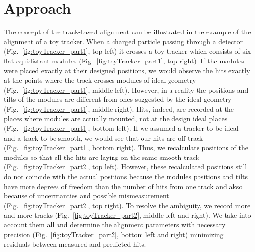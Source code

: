 \section{Approach}
\label{sec:alignmentAlg}


The concept of the track-based alignment can be illustrated in the example of the alignment of a toy tracker. When a charged particle passing through a detector (Fig.~\ref{fig:toyTracker_part1}, top left) it crosses a toy tracker which consists of six flat equidistant modules (Fig.~\ref{fig:toyTracker_part1}, top right). If the modules were placed exactly at their designed positions, we would observe the hits exactly at the points where the track crosses modules of ideal geometry (Fig.~\ref{fig:toyTracker_part1}, middle left). However, in a reality the positions and tilts of the modules are different from ones suggested by the ideal geometry (Fig.~\ref{fig:toyTracker_part1}, middle right). Hits, indeed, are recorded at the places where modules are actually mounted, not at the design ideal places (Fig.~\ref{fig:toyTracker_part1}, bottom left). If we assumed a tracker to be ideal and a track to be smooth, we would see that our hits are off-track (Fig.~\ref{fig:toyTracker_part1}, bottom right). Thus, we recalculate positions of the modules so that all the hits are laying on the same smooth track (Fig.~\ref{fig:toyTracker_part2}, top left). However, these recalculated positions still do not coincide with the actual positions because the modules positions and tilts have more degrees of freedom than the number of hits from one track and akso because of uncerntanties and possible mismeasurement (Fig.~\ref{fig:toyTracker_part2}, top right). To resolve the ambiguity, we record more and more tracks (Fig.~\ref{fig:toyTracker_part2}, middle left and right). We take into account them all and determine the alignment parameters with necessary precision (Fig.~\ref{fig:toyTracker_part2}, bottom left and right) minimizing residuals between measured and predicted hits.

